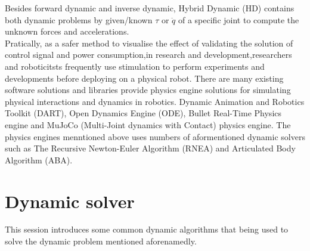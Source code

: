 \documentclass[report.tex]{subfiles}
\begin{document}
    Besides forward dynamic and inverse dynamic, Hybrid Dynamic (HD) contains both dynamic problems by given/known $\tau$ or $\ddot{q}$ of a specific joint to compute the unknown forces and accelerations.\\
    Pratically, as a safer method to visualise the effect of validating the solution of control signal and power consumption,in research and development,researchers and roboticitsts frequently use stimulation to perform experiments and developments before deploying on a physical robot. There are many existing software solutions and libraries provide physics engine solutions for simulating physical interactions and dynamics in robotics. Dynamic Animation and Robotics Toolkit (DART)\cite{Lee2018}, Open Dynamics Engine (ODE)\cite{ODE}, Bullet Real-Time Physics engine\cite{Admin_2022} and MuJoCo (Multi-Joint dynamics with Contact) physics engine\cite{MuJoCo}. The physics engines menntioned above uses numbers of aformentioned dynamic solvers such as The Recursive Newton-Euler Algorithm (RNEA) and Articulated Body Algorithm (ABA).

    \section{Dynamic solver}
    This session introduces some common dynamic algorithms that being used to solve the dynamic problem mentioned aforenamedly.
    \raggedbottom
\end{document}
